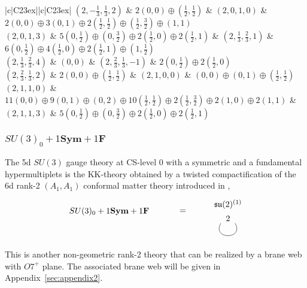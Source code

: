 \begin{table}
\begin{tabular}{|c|C{23ex}||c|C{23ex}|}
		$ (2, -\frac{1}{3}, \frac{1}{3}, 2) $ & $ 2(0, 0) \oplus (\frac{1}{2}, \frac{1}{2}) $ & $ (2, 0, 1, 0) $ & $ 2(0,0) \oplus 3(0,1) \oplus 2(\frac{1}{2},\frac{1}{2}) \oplus (\frac{1}{2},\frac{3}{2}) \oplus (1,1) $ \\ \hline
		$ (2, 0, 1, 3) $ & $ 5(0,\frac{1}{2}) \oplus (0,\frac{3}{2}) \oplus 2(\frac{1}{2},0) \oplus 2(\frac{1}{2},1) $ & $ (2, \frac{1}{3}, \frac{2}{3}, 1) $ & $ 6(0,\frac{1}{2}) \oplus 4(\frac{1}{2},0) \oplus 2(\frac{1}{2},1) \oplus (1,\frac{1}{2}) $ \\ \hline
		$ (2, \frac{1}{3}, \frac{2}{3}, 4) $ & $ (0, 0) $ & $ (2, \frac{2}{3}, \frac{1}{3}, -1) $ & $ 2(0, \frac{1}{2}) \oplus 2(\frac{1}{2}, 0) $ \\ \hline
		$ (2, \frac{2}{3}, \frac{1}{3}, 2) $ & $ 2(0,0) \oplus (\frac{1}{2},\frac{1}{2}) $ & $ (2, 1, 0, 0) $ & $ (0, 0) \oplus (0, 1) \oplus (\frac{1}{2}, \frac{1}{2}) $ \\ \hline
		$ (2, 1, 1, 0) $ & $ 11(0,0) \oplus 9(0,1) \oplus (0,2) \oplus 10(\frac{1}{2},\frac{1}{2}) \oplus 2(\frac{1}{2},\frac{3}{2}) \oplus 2(1,0) \oplus 2(1,1) $ & $ (2, 1, 1, 3) $ & $ 5(0,\frac{1}{2}) \oplus (0,\frac{3}{2}) \oplus 2(\frac{1}{2},0) \oplus 2(\frac{1}{2},1) $ \\ \hline
	\end{tabular}
	\caption{BPS spectrum of the $ SU(3)_{3/2} + 1\mathbf{Sym} $ for $ d_1 \leq 2 $ and $ d_2, d_3 \leq 1 $. Here, $ \mathbf{d} = (d_1, d_2, d_3, d_4) $ labels the BPS states with charge $ d_1 m_0 + d_2 \alpha_1 + d_3 \alpha_2 + d_4 m_1 $ for simple roots $ \alpha_1 $ and $ \alpha_2 $ of $ \mathfrak{su}(3) $ algebra.} \label{table:SU3_1Sym}
\end{table}


\subsubsection{\texorpdfstring{$ SU(3)_0 + 1\mathbf{Sym} + 1\mathbf{F} $}{SU(3)0 + 1Sym + 1F}}

The 5d $ SU(3) $ gauge theory at CS-level $ 0 $ with a symmetric and a fundamental hypermultiplets is the KK-theory obtained by a twisted compactification of the 6d rank-2 $(A_1,A_1)$ conformal matter theory introduced in \cite{DelZotto:2014hpa},
\begin{align}
\begin{tikzpicture}
\draw (0, 0) node {$ SU(3)_0 + 1\mathbf{Sym} + 1\mathbf{F} $}
(3.1, 0) node {$ = $}
(5, 0.3) node {$ \mathfrak{su}(2)^{(1)} $}
(5, -0.3) node {$ 2 $}
;
\draw (4.7, -0.5) .. controls (4.3, -1.2) and (5.7, -1.2) .. (5.3, -0.5);
\end{tikzpicture}
\end{align}
This is another non-geometric rank-2 theory that can be realized by a brane web with $O7^+$ plane. The associated brane web will be given in Appendix~\ref{sec:appendix2}.

